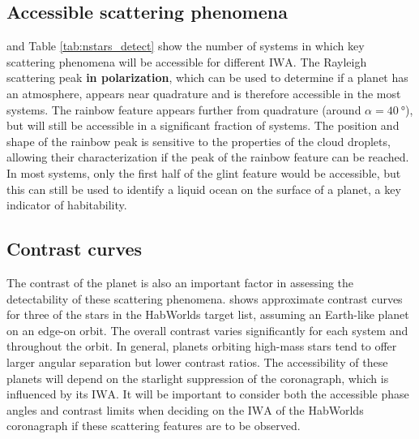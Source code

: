 \documentclass[usenatbib]{mnras}
\newcommand{\IWA}{\ensuremath{\mathrm{IWA}}\xspace}
\newcommand{\HWO}{HabWorlds\xspace}
\begin{document}
\subsection{Accessible scattering phenomena}

 and Table \ref{tab:nstars_detect} show the number of systems in which key scattering phenomena will be accessible for different \IWA.
%
The Rayleigh scattering peak {\bf in polarization}, which can be used to determine if a planet has an atmosphere, appears near quadrature and is therefore accessible in the most systems.
The rainbow feature appears further from quadrature (around $\alpha=\qty{40}{\degree}$), but will still be accessible in a significant fraction of systems.
%
The position and shape of the rainbow peak is sensitive to the properties of the cloud droplets, allowing their characterization if the peak of the rainbow feature can be reached.
%
In most systems, only the first half of the glint feature would be accessible, but this can still be used to identify a liquid ocean on the surface of a planet, a key indicator of habitability. 

\begin{table}
    \centering
    \caption{
        The expected number of targets for which the peak phase angle of each phenomenon would be detectable when assuming randomly inclined, eccentric orbits (see \cref{sec:eccentric}).
        For reference, the \HWO target list consists of 164 targets in total.
    }
    \label{tab:nstars_detect}
    
\end{table}

\subsection{Contrast curves}
\label{sec:results_contrast}

The contrast of the planet is also an important factor in assessing the detectability of these scattering phenomena. 
%
 shows approximate contrast curves for three of the stars in the \HWO target list, assuming an Earth-like planet on an edge-on orbit.
%
The overall contrast varies significantly for each system and throughout the orbit. 
%
In general, planets orbiting high-mass stars tend to offer larger angular separation but lower contrast ratios. 
%
The accessibility of these planets will depend on the starlight suppression of the coronagraph, which is influenced by its \IWA.
%
It will be important to consider both the accessible phase angles and contrast limits when deciding on the \IWA of the \HWO coronagraph if these scattering features are to be observed.
\end{document}
